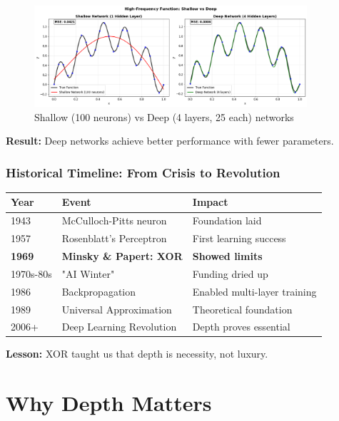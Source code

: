 \documentclass[notes]{beamer}
\begin{document}
\begin{frame}
\begin{frame}
\begin{figure}[ht]
	\centering
	\includegraphics[width=0.9\textwidth]{figs/high-freq-comparison.png}
	\caption*{Shallow (100 neurons) vs Deep (4 layers, 25 each) networks}
\end{figure}

\textbf{Result:} Deep networks achieve better performance with fewer parameters.

\end{frame}

\begin{frame}
\frametitle{Historical Timeline: From Crisis to Revolution}

\begin{center}
\begin{tabular}{l|l|l}
\textbf{Year} & \textbf{Event} & \textbf{Impact} \\
\hline
1943 & McCulloch-Pitts neuron & Foundation laid \\
1957 & Rosenblatt's Perceptron & First learning success \\
\textbf{1969} & \textbf{Minsky \& Papert: XOR} & \textbf{Showed limits} \\
1970s-80s & "AI Winter" & Funding dried up \\
1986 & Backpropagation & Enabled multi-layer training \\
1989 & Universal Approximation & Theoretical foundation \\
2006+ & Deep Learning Revolution & Depth proves essential \\
\end{tabular}
\end{center}

\textbf{Lesson:} XOR taught us that depth is necessity, not luxury.

\end{frame}

\section{Why Depth Matters}


\end{frame}
\end{document}
